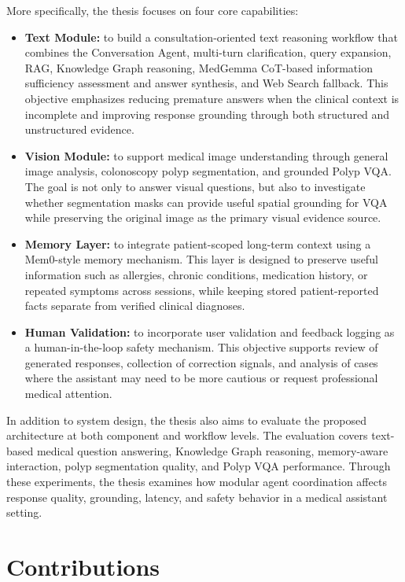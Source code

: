 More specifically, the thesis focuses on four core capabilities:

\begin{itemize}
    \item \textbf{Text Module:} to build a consultation-oriented text reasoning workflow that combines the Conversation Agent, multi-turn clarification, query expansion, RAG, Knowledge Graph reasoning, MedGemma CoT-based information sufficiency assessment and answer synthesis, and Web Search fallback. This objective emphasizes reducing premature answers when the clinical context is incomplete and improving response grounding through both structured and unstructured evidence.
    \item \textbf{Vision Module:} to support medical image understanding through general image analysis, colonoscopy polyp segmentation, and grounded Polyp VQA. The goal is not only to answer visual questions, but also to investigate whether segmentation masks can provide useful spatial grounding for VQA while preserving the original image as the primary visual evidence source.
    \item \textbf{Memory Layer:} to integrate patient-scoped long-term context using a Mem0-style memory mechanism. This layer is designed to preserve useful information such as allergies, chronic conditions, medication history, or repeated symptoms across sessions, while keeping stored patient-reported facts separate from verified clinical diagnoses.
    \item \textbf{Human Validation:} to incorporate user validation and feedback logging as a human-in-the-loop safety mechanism. This objective supports review of generated responses, collection of correction signals, and analysis of cases where the assistant may need to be more cautious or request professional medical attention.
\end{itemize}

In addition to system design, the thesis also aims to evaluate the proposed architecture at both component and workflow levels. The evaluation covers text-based medical question answering, Knowledge Graph reasoning, memory-aware interaction, polyp segmentation quality, and Polyp VQA performance. Through these experiments, the thesis examines how modular agent coordination affects response quality, grounding, latency, and safety behavior in a medical assistant setting.

\section{Contributions}

